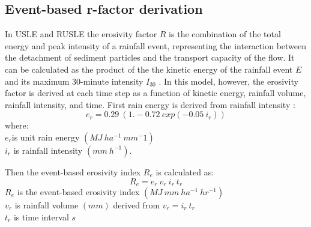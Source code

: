 \documentclass[final,3p,times,twocolumn]{elsarticle}
\begin{document}
\subsection{Event-based r-factor derivation} %
In USLE and RUSLE the erosivity factor $R$ is the 
combination of the total energy and peak intensity of a rainfall event,
representing the interaction between the detachment of sediment particles
and the transport capacity of the flow. 
It can be calculated as the product of the 
the kinetic energy of the rainfall event $E$
and its maximum 30-minute intensity $I_{30}$
\cite{Brown1987,Renard1997}.
%
In this model, however, the erosivity factor
is derived at each time step as a function of
kinetic energy, rainfall volume, rainfall intensity, and time.
%
First rain energy is derived from rainfall intensity \cite{Brown1987}:
\begin{equation}
\label{eq:rain_energy}
{e_r = 0.29 ~ (1.-0.72 ~ exp(-0.05 ~ i_r))}
\end{equation}
%
{\small
\noindent
where: \\
\noindent
\hspace*{0.5em} $e_r$is unit rain energy $(MJ ~ ha^{-1} ~ mm{^-1})$\\
\hspace*{0.5em} $i_r$ is rainfall intensity $(mm ~ h^{-1})$.\\
}

\noindent
Then the event-based erosivity index $R_e$ is calculated as:
\begin{equation}
\label{eq:erosivity_index}
{R_e = e_r ~ v_r ~ i_r ~ t_r}
\end{equation}
%
{\small
\noindent
\hspace*{0.5em} $R_e$ is the event-based erosivity index $(MJ ~ mm ~ ha^{-1} ~ hr^{-1})$\\
\hspace*{0.5em} $v_r$ is rainfall volume $(mm)$ derived from ${v_r = i_r ~ t_r}$\\
\hspace*{0.5em} $t_r$ is time interval $s$\\ 
}
\end{document}
